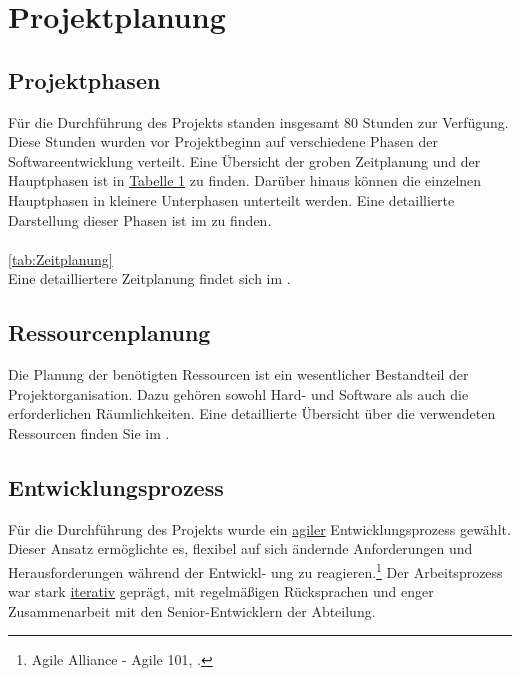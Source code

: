 
\section{Projektplanung} 
\label{sec:Projektplanung}

\subsection{Projektphasen}
\label{sec:Projektphasen}

Für die Durchführung des Projekts standen insgesamt 80 Stunden zur Verfügung. Diese Stunden wurden vor Projektbeginn auf verschiedene Phasen der Softwareentwicklung verteilt. Eine Übersicht der groben Zeitplanung und der Hauptphasen ist in
\hyperref[tab:Zeitplanung]{\textcolor{AOBlau}{Tabelle 1}} zu finden. Darüber hinaus können die einzelnen Hauptphasen in kleinere Unterphasen unterteilt werden. Eine detaillierte Darstellung dieser Phasen ist im  zu finden.

\paragraph{}
\ref{tab:Zeitplanung}
\\
Eine detailliertere Zeitplanung findet sich im .

\subsection{Ressourcenplanung}
\label{sec:Ressourcenplanung}

Die Planung der benötigten Ressourcen ist ein wesentlicher Bestandteil der Projektorganisation. Dazu gehören sowohl Hard- und Software als auch die erforderlichen Räumlichkeiten. Eine detaillierte Übersicht über die verwendeten Ressourcen finden Sie im . 

\subsection{Entwicklungsprozess}
\label{sec:Entwicklungsprozess}

Für die Durchführung des Projekts wurde ein \hyperlink{agil}{\textcolor{AOBlau}{agiler}} Entwicklungsprozess gewählt. Dieser Ansatz ermöglichte es, flexibel auf sich ändernde Anforderungen und Herausforderungen während der Entwickl-
ung zu reagieren.\footnote{Agile Alliance - Agile 101, \cite{agile}.} Der Arbeitsprozess war stark \hyperlink{iterativ}{\textcolor{AOBlau}{iterativ}} geprägt, mit regelmäßigen Rücksprachen und enger Zusammenarbeit mit den Senior-Entwicklern der Abteilung.

